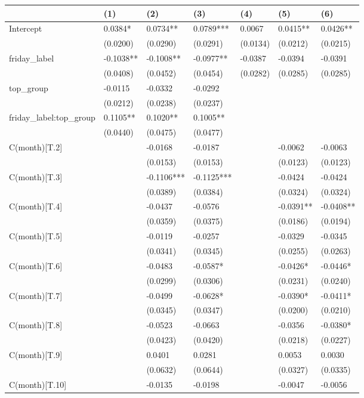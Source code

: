 \begin{tabular}{lllllll}
\toprule
 & (1) & (2) & (3) & (4) & (5) & (6) \\
\midrule
Intercept & 0.0384* & 0.0734** & 0.0789*** & 0.0067 & 0.0415** & 0.0426** \\
 & (0.0200) & (0.0290) & (0.0291) & (0.0134) & (0.0212) & (0.0215) \\
friday_label & -0.1038** & -0.1008** & -0.0977** & -0.0387 & -0.0394 & -0.0391 \\
 & (0.0408) & (0.0452) & (0.0454) & (0.0282) & (0.0285) & (0.0285) \\
top_group & -0.0115 & -0.0332 & -0.0292 &  &  &  \\
 & (0.0212) & (0.0238) & (0.0237) &  &  &  \\
friday_label:top_group & 0.1105** & 0.1020** & 0.1005** &  &  &  \\
 & (0.0440) & (0.0475) & (0.0477) &  &  &  \\
C(month)[T.2] &  & -0.0168 & -0.0187 &  & -0.0062 & -0.0063 \\
 &  & (0.0153) & (0.0153) &  & (0.0123) & (0.0123) \\
C(month)[T.3] &  & -0.1106*** & -0.1125*** &  & -0.0424 & -0.0424 \\
 &  & (0.0389) & (0.0384) &  & (0.0324) & (0.0324) \\
C(month)[T.4] &  & -0.0437 & -0.0576 &  & -0.0391** & -0.0408** \\
 &  & (0.0359) & (0.0375) &  & (0.0186) & (0.0194) \\
C(month)[T.5] &  & -0.0119 & -0.0257 &  & -0.0329 & -0.0345 \\
 &  & (0.0341) & (0.0345) &  & (0.0255) & (0.0263) \\
C(month)[T.6] &  & -0.0483 & -0.0587* &  & -0.0426* & -0.0446* \\
 &  & (0.0299) & (0.0306) &  & (0.0231) & (0.0240) \\
C(month)[T.7] &  & -0.0499 & -0.0628* &  & -0.0390* & -0.0411* \\
 &  & (0.0345) & (0.0347) &  & (0.0200) & (0.0210) \\
C(month)[T.8] &  & -0.0523 & -0.0663 &  & -0.0356 & -0.0380* \\
 &  & (0.0423) & (0.0420) &  & (0.0218) & (0.0227) \\
C(month)[T.9] &  & 0.0401 & 0.0281 &  & 0.0053 & 0.0030 \\
 &  & (0.0632) & (0.0644) &  & (0.0327) & (0.0335) \\
C(month)[T.10] &  & -0.0135 & -0.0198 &  & -0.0047 & -0.0056 \\

\end{tabular}
